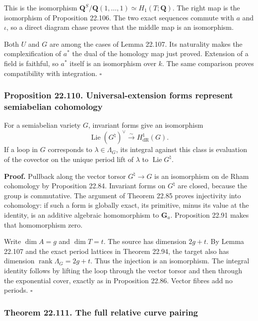 \documentclass[
  11pt,
  a4paper,
]{article}
\begin{document}
This is the isomorphism
\(\mathbf Q^S/\mathbf Q(1,\ldots,1)\simeq H_1(T;\mathbf Q)\). The right
map is the isomorphism of Proposition 22.106. The two exact sequences
commute with \(a\) and \(\iota\), so a direct diagram chase proves that
the middle map is an isomorphism.

Both \(U\) and \(G\) are among the cases of Lemma 22.107. Its naturality
makes the complexification of \(a^*\) the dual of the homology map just
proved. Extension of a field is faithful, so \(a^*\) itself is an
isomorphism over \(k\). The same comparison proves compatibility with
integration. \(\square\)

\subsubsection{Proposition 22.110. Universal-extension forms represent
semiabelian
cohomology}\label{proposition-22.110.-universal-extension-forms-represent-semiabelian-cohomology}

For a semiabelian variety \(G\), invariant forms give an isomorphism \[
 \operatorname{Lie}(G^\natural)^\vee
       \xrightarrow{\sim} H^1_{\mathrm{dR}}(G).
 \tag{22.276}
\] If a loop in \(G\) corresponds to \(\lambda\in\Lambda_G\), its
integral against this class is evaluation of the covector on the unique
period lift of \(\lambda\) to \(\operatorname{Lie}G^\natural\).

\textbf{Proof.} Pullback along the vector torsor \(G^\natural\to G\) is
an isomorphism on de Rham cohomology by Proposition 22.84. Invariant
forms on \(G^\natural\) are closed, because the group is commutative.
The argument of Theorem 22.85 proves injectivity into cohomology: if
such a form is globally exact, its primitive, minus its value at the
identity, is an additive algebraic homomorphism to \(\mathbf G_a\).
Proposition 22.91 makes that homomorphism zero.

Write \(\dim A=g\) and \(\dim T=t\). The source has dimension \(2g+t\).
By Lemma 22.107 and the exact period lattices in Theorem 22.94, the
target also has dimension \(\operatorname{rank}\Lambda_G=2g+t\). Thus
the injection is an isomorphism. The integral identity follows by
lifting the loop through the vector torsor and then through the
exponential cover, exactly as in Proposition 22.86. Vector fibres add no
periods. \(\square\)

\subsubsection{Theorem 22.111. The full relative curve
pairing}\label{theorem-22.111.-the-full-relative-curve-pairing}
\end{document}
